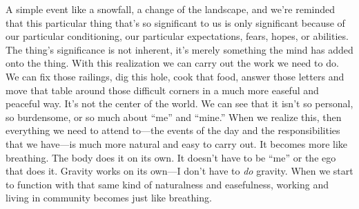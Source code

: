 A simple event like a snowfall, a change of the landscape, and we're 
reminded that this particular thing that's so significant to us is only 
significant because of our particular conditioning, our particular 
expectations, fears, hopes, or abilities. The thing's significance is 
not inherent, it's merely something the mind has added onto the thing. 
With this realization we can carry out the work we need to do. We can 
fix those railings, dig this hole, cook that food, answer those letters 
and move that table around those difficult corners in a much more 
easeful and peaceful way. It's not the center of the world. We can see 
that it isn't so personal, so burdensome, or so much about ``me'' and 
``mine.'' When we realize this, then everything we need to attend 
to---the events of the day and the responsibilities that we have---is 
much more natural and easy to carry out. It becomes more like 
breathing. The body does it on its own. It doesn't have to be ``me'' or 
the ego that does it. Gravity works on its own---I don't have to 
\emph{do} gravity. When we start to function with that same kind of 
naturalness and easefulness, working and living in community becomes 
just like breathing.


